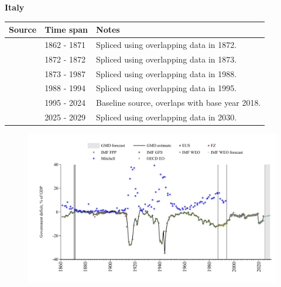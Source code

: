 \documentclass[12pt,a4paper,landscape]{article}
\begin{document}
\begin{adjustbox}{max totalsize={\paperwidth}{\paperheight},center}
\begin{minipage}[t][\textheight][t]{\textwidth}
\vspace*{0.5cm}
{}
\begin{center}
{\Large\bfseries Italy}
\end{center}
\vspace{0.5cm}
\begin{table}[H]
\centering
\small
\begin{tabular}{|l|l|l|}
\hline
\textbf{Source} & \textbf{Time span} & \textbf{Notes} \\
\hline
\rowcolor{white}\cite{IMF_FPP}& 1862 - 1871 &Spliced using overlapping data in 1872.\\
\rowcolor{lightgray}\cite{Mitchell}& 1872 - 1872 &Spliced using overlapping data in 1873.\\
\rowcolor{white}\cite{IMF_FPP}& 1873 - 1987 &Spliced using overlapping data in 1988.\\
\rowcolor{lightgray}\cite{IMF_WEO}& 1988 - 1994 &Spliced using overlapping data in 1995.\\
\rowcolor{white}\cite{EUS}& 1995 - 2024 &Baseline source, overlaps with base year 2018.\\
\rowcolor{lightgray}\cite{IMF_WEO_forecast}& 2025 - 2029 &Spliced using overlapping data in 2030.\\
\hline
\end{tabular}
\end{table}
\begin{figure}[H]
\centering
\includegraphics[width=\textwidth,height=0.6\textheight,keepaspectratio]{graphs/ITA_govdef_GDP.pdf}
\end{figure}
\end{minipage}
\end{adjustbox}
\end{document}
